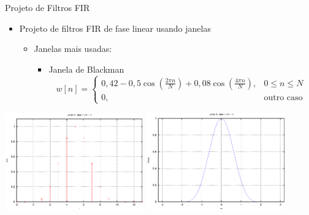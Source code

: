 \begin{slide}{Projeto de Filtros FIR}
\begin{itemize}
   \item  Projeto de filtros FIR de fase linear usando janelas 
   \begin{itemize}
      \item Janelas mais usadas:
      \begin{itemize}
         \item Janela de Blackman
         \begin{equation*}
            w[n] = \begin{cases}0,42-0,5\cos\left ( \frac{2\pi n}{N}\right ) + 0,08\cos\left ( \frac{4\pi n}{N}\right ),&0\leq n\leq N\\ 0,& \text{outro caso}\end{cases}
         \end{equation*}
       \end{itemize}
   \end{itemize}
\end{itemize}
\includegraphics[width=0.45\textwidth]{figs/wn_bla_10.eps}
\includegraphics[width=0.45\textwidth]{figs/w_bla_10.eps}
\end{slide}

